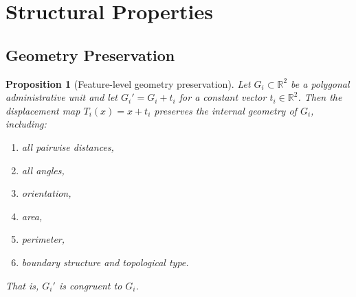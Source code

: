 \documentclass[12pt, a4paper]{article}
\numberwithin{equation}{section}
\theoremstyle{definition}
\theoremstyle{plain}
\newtheorem{proposition}{Proposition}[section]
\theoremstyle{remark}
\newcommand{\R}{\mathbb{R}}
\begin{document}
\section{Structural Properties}
\label{sec:properties}

\subsection{Geometry Preservation}

\begin{proposition}[Feature-level geometry preservation]
\label{prop:geometry}
Let $G_i \subset \R^2$ be a polygonal administrative unit and let $G_i' = G_i + t_i$ for a constant vector $t_i \in \R^2$. Then the displacement map $T_i(x) = x + t_i$ preserves the internal geometry of $G_i$, including:
\begin{enumerate}[label=(\alph*)]
  \item all pairwise distances,
  \item all angles,
  \item orientation,
  \item area,
  \item perimeter,
  \item boundary structure and topological type.
\end{enumerate}
That is, $G_i'$ is congruent to $G_i$.
\end{proposition}
\end{document}
